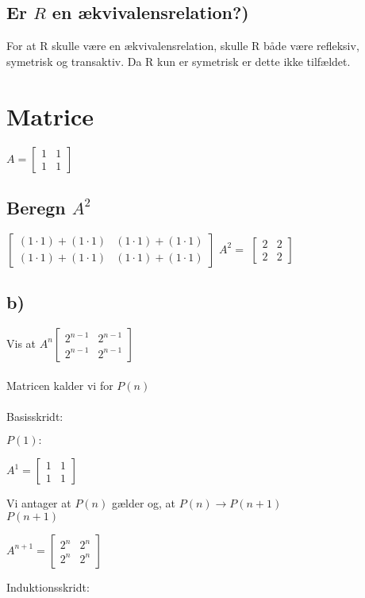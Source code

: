 \documentclass[a4paper,10pt]{article}
\begin{document}
\subsection*{Er $R$ en ækvivalensrelation?)}
For at R skulle være en ækvivalensrelation, skulle R både være refleksiv, symetrisk og transaktiv. Da R kun er symetrisk er dette ikke tilfældet.
\section{Matrice}
$A = \begin{bmatrix}
1&1\\1&1
\end{bmatrix}
$
\subsection*{Beregn $A^2$}
\begin{center}

$\begin{bmatrix}
(1\cdot1)+(1\cdot1)& (1\cdot1)+(1\cdot1)\\
(1\cdot1)+(1\cdot1)&(1\cdot1)+(1\cdot1)
\end{bmatrix}
$
$ A^2 =$ 
$\begin{bmatrix}
2&2\\2&2
\end{bmatrix}
$

\end{center}\newpage
\subsection*{b)}
Vis at $A^n \begin{bmatrix}
2^{n-1}&2^{n-1}\\2^{n-1}&2^{n-1}
\end{bmatrix}$\\\\
Matricen kalder vi for $P(n)$
\\\\Basisskridt:

$P(1):$\\\begin{center}
$A^1=\begin{bmatrix}
1&1\\1&1
\end{bmatrix}
$
\end{center}
Vi antager at $P(n)$ gælder og, at $P(n) \rightarrow P(n+1)$\\
$P(n+1)$
\begin{center}
$A^{n+1} = \begin{bmatrix}
2^n&2^n\\2^n&2^n
\end{bmatrix}$
\end{center}
Induktionsskridt:
\end{document}
